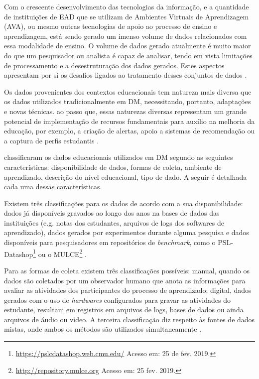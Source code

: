 Com o crescente desenvolvimento das tecnologias da informação, e a quantidade de
instituições de EAD que se utilizam de Ambientes Virtuais de Aprendizagem (AVA),
ou mesmo outras tecnologias de apoio ao processo de ensino e aprendizagem, está
sendo gerado um imenso volume de dados relacionados com essa modalidade de
ensino. O volume de dados gerado atualmente é muito maior do que um pesquisador
ou analista  é capaz de analisar, tendo em vista limitações de processamento e a
desestruturação dos dados gerados. Estes aspectos apresentam por si os desafios
ligados ao tratamento desses conjuntos de dados
\cite{rigo2014aplicaccoes,costa2012mineraccao}.

Os dados provenientes dos contextos educacionais tem natureza mais diversa que
os dados utilizados tradicionalmente em DM, necessitando, portanto, adaptações e
novas técnicas. ao passo que, essas naturezas diversas representam um grande
potencial de implementação de recursos fundamentais para auxílio na melhoria da
educação, por exemplo, a criação de alertas, apoio a sistemas de recomendação ou
a captura de perfis estudantis \cite{rigo2014aplicaccoes}.

 classificaram os dados educacionais
utilizados em DM segundo as seguintes características: disponibilidade de dados,
formas de coleta, ambiente de aprendizado, descrição do nível educacional, tipo
de dado. A seguir é detalhada cada uma dessas características.

Existem três classificações para os dados de acordo com a sua disponibilidade:
dados já disponíveis gravados ao longo dos anos na bases de dados das
instituições (e.g. notas dos estudantes, arquivos de logs dos softwares de
aprendizado), dados gerados por experimentos durante alguma pesquisa e dados
disponíveis para pesquisadores em repositórios de \textit{benchmark}, como o
PSL-Datashop\footnote{\url{https://pslcdatashop.web.cmu.edu/} Acesso em: 25 de
fev. 2019.} ou o MULCE\footnote{\url{http://repository.mulce.org} Acesso em: 25
fev. 2019.} \cite{bousbia2014contribution}.

Para as formas de coleta existem três classificações possíveis: manual, quando
os dados são coletados por um observador humano que anota as informações para
avaliar as atividades dos participantes do processo de aprendizado; digital,
dados gerados com o uso de \textit{hardwares} configurados para gravar as
atividades do estudante, resultam em registros em arquivos de logs, bases de
dados ou ainda arquivos de áudio ou vídeo. A terceira classificação diz respeito
às fontes de dados mistas, onde ambos os métodos são utilizados simultaneamente
\cite{bousbia2014contribution}.

